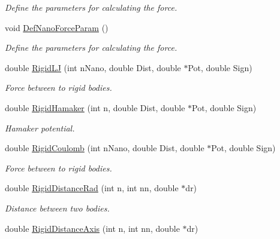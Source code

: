 \begin{DoxyCompactItemize}
\begin{DoxyCompactList}\small\item\em Define the parameters for calculating the force. \end{DoxyCompactList}\item 
void \hyperlink{classForces_ae1187ff72e7ad2765b17948df1aff2b4}{Def\+Nano\+Force\+Param} ()\hypertarget{classForces_ae1187ff72e7ad2765b17948df1aff2b4}{}\label{classForces_ae1187ff72e7ad2765b17948df1aff2b4}

\begin{DoxyCompactList}\small\item\em Define the parameters for calculating the force. \end{DoxyCompactList}\item 
double \hyperlink{classForces_a299061ca48b352b4d40c0dfbb6ffd2da}{Rigid\+LJ} (int n\+Nano, double Dist, double $\ast$Pot, double Sign)\hypertarget{classForces_a299061ca48b352b4d40c0dfbb6ffd2da}{}\label{classForces_a299061ca48b352b4d40c0dfbb6ffd2da}

\begin{DoxyCompactList}\small\item\em Force between to rigid bodies. \end{DoxyCompactList}\item 
double \hyperlink{classForces_abd9350bc451b7ae5507675805b4318d5}{Rigid\+Hamaker} (int n, double Dist, double $\ast$Pot, double Sign)
\begin{DoxyCompactList}\small\item\em Hamaker potential. \end{DoxyCompactList}\item 
double \hyperlink{classForces_af8f6e965e516633b54115556243a681a}{Rigid\+Coulomb} (int n\+Nano, double Dist, double $\ast$Pot, double Sign)\hypertarget{classForces_af8f6e965e516633b54115556243a681a}{}\label{classForces_af8f6e965e516633b54115556243a681a}

\begin{DoxyCompactList}\small\item\em Force between to rigid bodies. \end{DoxyCompactList}\item 
double \hyperlink{classForces_a4aa4b64aa78c004e13b7d5e059c61c7f}{Rigid\+Distance\+Rad} (int n, int nn, double $\ast$dr)\hypertarget{classForces_a4aa4b64aa78c004e13b7d5e059c61c7f}{}\label{classForces_a4aa4b64aa78c004e13b7d5e059c61c7f}

\begin{DoxyCompactList}\small\item\em Distance between two bodies. \end{DoxyCompactList}\item 
double \hyperlink{classForces_a0bd8b1fc300bbbf7b4d7a6c5836ff0dc}{Rigid\+Distance\+Axis} (int n, int nn, double $\ast$dr)\hypertarget{classForces_a0bd8b1fc300bbbf7b4d7a6c5836ff0dc}{}\label{classForces_a0bd8b1fc300bbbf7b4d7a6c5836ff0dc}


\end{DoxyCompactItemize}
